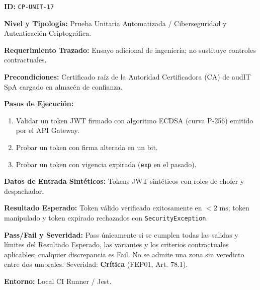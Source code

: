 \par\noindent\textbf{ID:} \texttt{C\allowbreak{}P\allowbreak{}-\allowbreak{}U\allowbreak{}N\allowbreak{}I\allowbreak{}T\allowbreak{}-\allowbreak{}1\allowbreak{}7\allowbreak{}}\par
\par\noindent\textbf{Nivel y Tipología:} Prueba Unitaria Automatizada / Ciberseguridad y Autenticación Criptográfica.\par
\par\noindent\textbf{Requerimiento Trazado:} Ensayo adicional de ingeniería; no sustituye controles contractuales.\par
\par\noindent\textbf{Precondiciones:} Certificado raíz de la Autoridad Certificadora (CA) de audIT SpA cargado en almacén de confianza.\par
\par\noindent\textbf{Pasos de Ejecución:} \par
\begin{enumerate}
\item Validar un token JWT firmado con algoritmo ECDSA (curva P-256) emitido por el API Gateway.
\item Probar un token con firma alterada en un bit.
\item Probar un token con vigencia expirada (\texttt{e\allowbreak{}x\allowbreak{}p\allowbreak{}} en el pasado).
\end{enumerate}
\par\noindent\textbf{Datos de Entrada Sintéticos:} Tokens JWT sintéticos con roles de chofer y despachador.\par
\par\noindent\textbf{Resultado Esperado:} Token válido verificado exitosamente en \(< 2\text{ ms}\); token manipulado y token expirado rechazados con \texttt{S\allowbreak{}e\allowbreak{}c\allowbreak{}u\allowbreak{}r\allowbreak{}i\allowbreak{}t\allowbreak{}y\allowbreak{}E\allowbreak{}x\allowbreak{}c\allowbreak{}e\allowbreak{}p\allowbreak{}t\allowbreak{}i\allowbreak{}o\allowbreak{}n\allowbreak{}}.\par
\par\noindent\textbf{Pass/Fail y Severidad:} Pass únicamente si se cumplen todas las salidas y límites del Resultado Esperado, las variantes y los criterios contractuales aplicables; cualquier discrepancia es Fail. No se admite una zona sin veredicto entre dos umbrales. Severidad: \textbf{Crítica} (FEP01, Art. 78.1).\par
\par\noindent\textbf{Entorno:} Local CI Runner / Jest.\par






